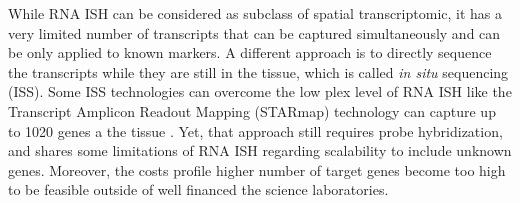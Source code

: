 While RNA ISH can be considered as subclass of spatial transcriptomic, it has a very limited number of transcripts that can be captured simultaneously and can be only applied to known markers. A different approach is to directly sequence the transcripts while they are still in the tissue, which is called \textit{in situ} sequencing (ISS). Some ISS technologies can overcome the low plex level of RNA ISH like the Transcript Amplicon Readout Mapping (STARmap) technology can capture up to 1020 genes a the tissue \cite{wang2018three}. Yet, that approach still requires probe hybridization, and shares some limitations of RNA ISH \cite{ke2013situ,hernandez2019mapping,chen2018efficient} regarding scalability to include unknown genes. Moreover, the costs profile higher number of target genes become too high to be feasible outside of well financed the science laboratories.


